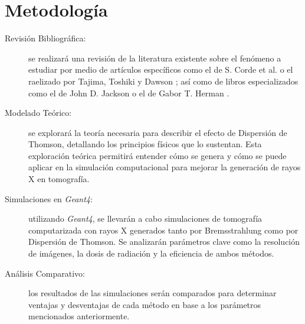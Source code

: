 \vspace*{\fill}

\section{Metodología}


\begin{description}
    \item[Revisión Bibliográfica: ] se realizará una revisión de la literatura existente sobre el fenómeno a estudiar por medio de artículos específicos como el de S. Corde et al. \cite{corde2013femtosecond} o el raelizado por Tajima, Toshiki y Dawson \cite{tajima1979laser}; así como de libros especializados como el de John D. Jackson \cite{jackson2021classical} o el de Gabor T. Herman \cite{herman2009fundamentals}.
    \item[Modelado Teórico: ] se explorará la teoría necesaria para describir el efecto de Dispersión de Thomson, detallando los principios físicos que lo sustentan. Esta exploración teórica permitirá entender cómo se genera y cómo se puede aplicar en la simulación computacional para mejorar la generación de rayos X en tomografía.
    \item[Simulaciones en \textit{Geant4}: ] utilizando \textit{Geant4}, se llevarán a cabo simulaciones de tomografía computarizada con rayos X generados tanto por Bremsstrahlung como por Dispersión de Thomson. Se analizarán parámetros clave como la resolución de imágenes, la dosis de radiación y la eficiencia de ambos métodos.
    \item[Análisis Comparativo: ] los resultados de las simulaciones serán comparados para determinar ventajas y desventajas de cada método en base a los parámetros mencionados anteriormente.
\end{description}


\vspace*{\fill}